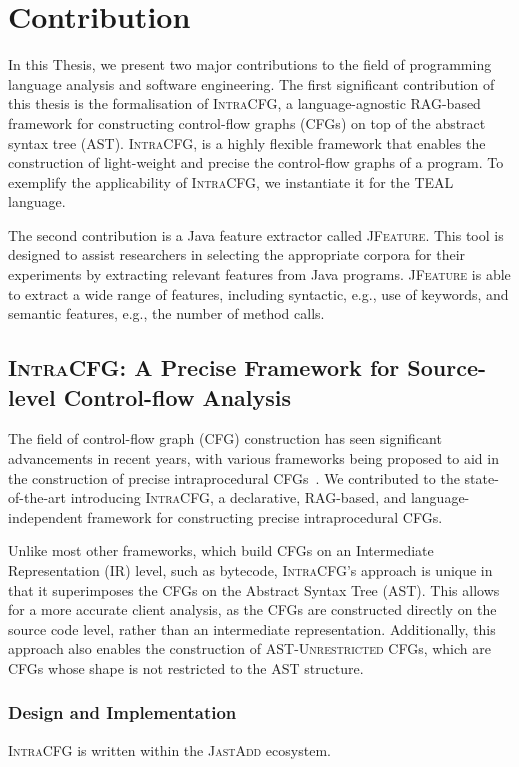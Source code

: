 \section{Contribution}
\label{sec:contribution}
In this Thesis, we present two major contributions to the field of programming 
language analysis and software engineering. 
The first significant contribution of this thesis is the formalisation of \textsc{IntraCFG},
a language-agnostic RAG-based framework for constructing control-flow graphs (CFGs) 
on top of the abstract syntax tree (AST). \textsc{IntraCFG}, is a highly flexible
framework that enables the construction of light-weight and precise the control-flow graphs
of a program. To exemplify the applicability of \textsc{IntraCFG}, we instantiate it for the TEAL language.

The second contribution is a Java feature extractor called \textsc{JFeature}.
This tool is designed to assist researchers in selecting the appropriate corpora
for their experiments by extracting relevant features from Java programs. 
\textsc{JFeature} is able to extract a wide range of features, 
including syntactic, e.g., use of keywords, and semantic features, e.g.,
the number of method calls.


\subsection{\textsc{IntraCFG}: A Precise Framework for Source-level Control-flow Analysis}
The field of control-flow graph (CFG) construction has seen significant advancements
in recent years, with various frameworks being proposed to aid in the construction 
of precise intraprocedural CFGs~\cite{smits2020flowspec,10.1016/j.scico.2012.02.002}.
We contributed to the state-of-the-art introducing \textsc{IntraCFG}, a declarative, RAG-based,
and language-independent framework for constructing precise intraprocedural CFGs.

Unlike most other frameworks, which build CFGs on an Intermediate Representation (IR) level,
such as bytecode, \textsc{IntraCFG}'s approach is unique in that it superimposes the CFGs 
on the Abstract Syntax Tree (AST). This allows for a more accurate client analysis,
as the CFGs are constructed directly on the source code level, rather than an
intermediate representation. Additionally, this approach also enables the construction 
of \textsc{AST-Unrestricted} CFGs, which are CFGs whose shape is not restricted to the AST structure.

\subsubsection*{Design and Implementation}
\textsc{IntraCFG} is written within the \textsc{JastAdd} ecosystem.

